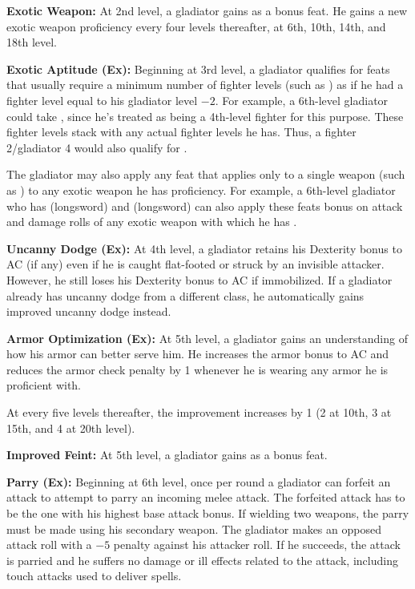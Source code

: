 \textbf{Exotic Weapon:} At 2nd level, a gladiator gains  as a bonus feat. He gains a new exotic weapon proficiency every four levels thereafter, at 6th, 10th, 14th, and 18th level.

\textbf{Exotic Aptitude (Ex):} Beginning at 3rd level, a gladiator qualifies for feats that usually require a minimum number of fighter levels (such as ) as if he had a fighter level equal to his gladiator level $-2$. For example, a 6th-level gladiator could take , since he's treated as being a 4th-level fighter for this purpose. These fighter levels stack with any actual fighter levels he has. Thus, a fighter 2/gladiator 4 would also qualify for .

The gladiator may also apply any feat that applies only to a single weapon (such as ) to any exotic weapon he has proficiency. For example, a 6th-level gladiator who has  (longsword) and  (longsword) can also apply these feats bonus on attack and damage rolls of any exotic weapon with which he has .

\textbf{Uncanny Dodge (Ex):} At 4th level, a gladiator retains his Dexterity bonus to AC (if any) even if he is caught flat-footed or struck by an invisible attacker. However, he still loses his Dexterity bonus to AC if immobilized. If a gladiator already has uncanny dodge from a different class, he automatically gains improved uncanny dodge instead.

\textbf{Armor Optimization (Ex):} At 5th level, a gladiator gains an understanding of how his armor can better serve him. He increases the armor bonus to AC and reduces the armor check penalty by 1 whenever he is wearing any armor he is proficient with.

At every five levels thereafter, the improvement increases by 1 (2 at 10th, 3 at 15th, and 4 at 20th level).

\textbf{Improved Feint:} At 5th level, a gladiator gains  as a bonus feat.


\textbf{Parry (Ex):} Beginning at 6th level, once per round a gladiator can forfeit an attack to attempt to parry an incoming melee attack. The forfeited attack has to be the one with his highest base attack bonus. If wielding two weapons, the parry must be made using his secondary weapon. The gladiator makes an opposed attack roll with a $-5$ penalty against his attacker roll. If he succeeds, the attack is parried and he suffers no damage or ill effects related to the attack, including touch attacks used to deliver spells.

